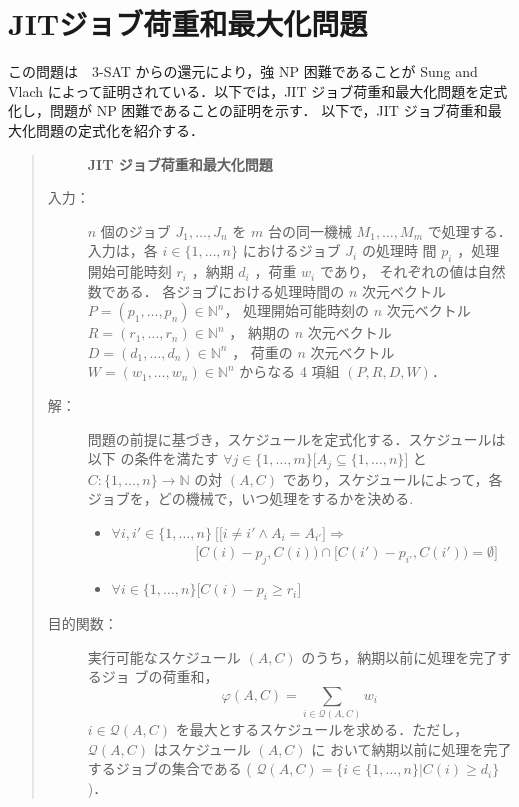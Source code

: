 \documentclass[12pt]{optlab-bachelor}
\begin{document}
\section{JITジョブ荷重和最大化問題}\label{3_s_1}
この問題は　\textsc{3-SAT} からの還元により，強 NP 困難であることが Sung and Vlach \cite{SJIT} によって証明されている．以下では，JIT ジョブ荷重和最大化問題を定式化し，問題が NP 困難であることの証明を示す．
以下で，JIT ジョブ荷重和最大化問題の定式化を紹介する．
\begin{quote}
  \begin{description}
    \item[] {\bf JIT ジョブ荷重和最大化問題}
    \item[入力：] $n$ 個のジョブ $J_1,\ldots,J_n$ を $m$ 台の同一機械 $M_1,\ldots,M_m$
    で処理する．入力は，各 $i \in \{1,\ldots,n\}$ におけるジョブ $J_i$ の処理時
    間 $p_i$ ，処理開始可能時刻 $r_i$ ，納期 $d_i$ ，荷重 $w_i$ であり，
    それぞれの値は自然数である．
    各ジョブにおける処理時間の $n$ 次元ベクトル $P = (p_1,\ldots,p_n) \in \mathbb{N}^n$，
    処理開始可能時刻の $n$ 次元ベクトル $R = (r_1,\ldots,r_n) \in \mathbb{N}^n$ ，
    納期の $n$ 次元ベクトル $D = (d_1,\ldots,d_n) \in \mathbb{N}^n$ ，
    荷重の $n$ 次元ベクトル $W = (w_1,\ldots,w_n) \in \mathbb{N}^n$ からなる 4 項組 $(P,R,D,W)$．
    \item[解：] 問題の前提に基づき，スケジュールを定式化する．スケジュールは以下
    の条件を満たす $\forall j \in \{1,\ldots,m\}\big[A_j \subseteq
    \{1,\ldots,n\}\big]$ と $C : \{1,\ldots,n\} \to \mathbb{N}$ の対 $(A,
    C)$ であり，スケジュールによって，各ジョブを，どの機械で，いつ処理をするかを決める.
    \begin{itemize}
      \item $\forall i, i' \in \{1,\ldots,n\}\ \Big[ \big[i \neq i' \land A_i = A_{i'}\big] \Rightarrow$ \\ $~~~~~~~~~~~~~~~~~~~~~~~~~~~[C(i) - p_j, C(i)) \cap [C(i') - p_{i'}, C(i')) = \emptyset \Big]$
      \item  $\forall i \in \{1,\ldots,n\}\big[C(i) - p_i \ge r_i\big]$
    \end{itemize}
    \item[目的関数：] 実行可能なスケジュール $(A, C)$ のうち，納期以前に処理を完了するジョ
    ブの荷重和，
    \begin{displaymath}
      \displaystyle \varphi(A,C) = \sum_{i \in \mathcal{Q}(A,C)}w_i
    \end{displaymath}
    $i \in \mathcal{Q}(A,C)$ を最大とするスケジュールを求める．ただし，
    $\mathcal{Q}(A, C)$ はスケジュール $(A, C)$ に
    おいて納期以前に処理を完了するジョブの集合である (
    $\mathcal{Q}(A, C) = \{i \in \{1,\ldots, n\} | C(i) \ge d_i \}$ )．
  \end{description}
\end{quote}
\end{document}
